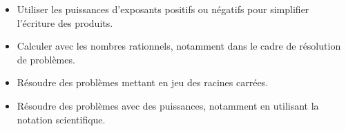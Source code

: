 \documentclass[a4paper,12pt,fleqn]{article}	
\begin{document}
\begin{itemize}
	\item {}Utiliser les puissances d’exposants positifs ou négatifs pour simplifier l’écriture des produits.
	\item {}Calculer avec les nombres rationnels, notamment dans le cadre de résolution de problèmes.
	\item {}Résoudre des problèmes mettant en jeu des racines carrées.
	\item {}Résoudre des problèmes avec des puissances, notamment en utilisant la notation scientifique.
\end{itemize}
	
\end{document}
